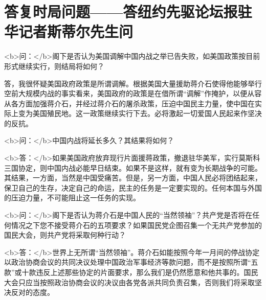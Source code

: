 \section[答复时局问题——答纽约先驱论坛报驻华记者斯蒂尔先生问（一九四六年九月二十九日）]{答复时局问题——答纽约先驱论坛报驻华记者斯蒂尔先生问}


<b>问：</b>阁下是否认为美国调解中国内战之举已告失败，如美国政策按目前形式继续实行，则结局将如何？

答，我很怀疑美国政府政策是所谓调解。根据美国大量援助蒋介石使得他能够举行空前大规模内战的事实看来，美国政府的政策是在借所谓“调解”作掩护，以便从容从各方面加强蒋介石，并经过蒋介石的屠杀政策，压迫中国民主力量，使中国在实际上变为美国殖民地。这一政策继续实行下去。必将激起一切爱国人民起来作坚决的反抗。

<b>问：</b>中国内战将延长多久？其结果将如何？

<b>答：</b>如果美国政府放弃现行片面援蒋政策，撤退驻华美军，实行莫斯科三国协定，则中国内战必能早日结束。如果不是这样，就有变为长期战争的可能。其结果，一方面，当然是中国受痛苦。但是，另一方面，中国人民必将团结起来，保卫自己的生存，决定自己的命运，民主的任务是一定要实现的。任何本国与外国的压迫力量，不可能阻止这一任务的实现。

<b>问：</b>阁下是否认为蒋介石是中国人民的“当然领袖”？共产党是否将在任何情况之下您不接受蒋介石的五项要求？如果国民党企图召集一个无共产党参加的国民大会，则共产党将采取何种行动？

<b>答：</b>世界上无所谓“当然领袖”。蒋介石如能按照今年一月间的停战协定以政治协商会议的共同决议处理中国政治军事经济等款问题，而不是按照所谓“五款”或十款违反上述那些协定的片面要求，那么我们是仍然愿意和他共事的。国民大会只应当按照政治协商会议的决议由各党各派共同负责召集，否则我们将采取坚决反对的态度。

